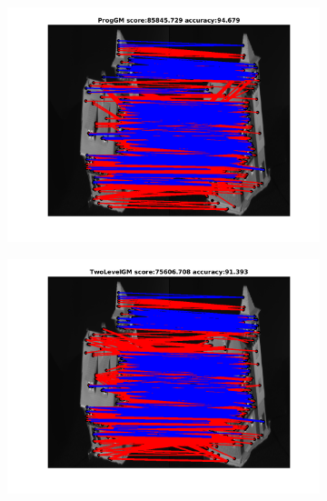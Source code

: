 \documentclass[
	fontsize=12pt,
	paper=a4,
	twoside=false,
	numbers=noenddot,
	plainheadsepline,
	toc=listof,
	toc=bibliography
]{scrartcl}
\begin{document}
\begin{figure}[h] 	
	\begin{subfigure}[b]{0.3\textwidth}
		\centering
		\includegraphics[scale=0.25]{"fig_ver2608/RealImages/HouseSeq/anchor_descr/using_cpd_afftrafo/ext_solution/fi_4_ProgGM"}  
	\end{subfigure}%
	\begin{subfigure}[b]{0.3\textwidth}
		\centering
		\includegraphics[scale=0.25]{"fig_ver2608/RealImages/HouseSeq/anchor_descr/using_cpd_afftrafo/ext_solution/fi_4_TwoLevelGM"}  
	\end{subfigure} 
	\begin{subfigure}[b]{0.3\textwidth}
		\centering

\end{subfigure}
\end{figure}
\end{document}
